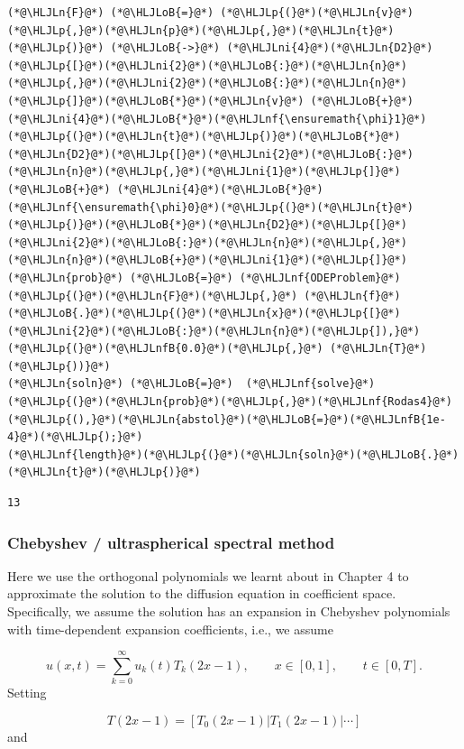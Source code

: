 \documentclass[12pt,a4paper]{article}
\newcommand{\HLJLn}[1]{#1}
\newcommand{\HLJLnf}[1]{\textcolor[RGB]{66,102,213}{#1}}
\newcommand{\HLJLnfB}[1]{\textcolor[RGB]{59,151,46}{#1}}
\newcommand{\HLJLni}[1]{\textcolor[RGB]{59,151,46}{#1}}
\newcommand{\HLJLoB}[1]{\textcolor[RGB]{102,102,102}{\textbf{#1}}}
\newcommand{\HLJLp}[1]{#1}
\begin{document}
\begin{lstlisting}
(*@\HLJLn{F}@*) (*@\HLJLoB{=}@*) (*@\HLJLp{(}@*)(*@\HLJLn{v}@*)(*@\HLJLp{,}@*)(*@\HLJLn{p}@*)(*@\HLJLp{,}@*)(*@\HLJLn{t}@*)(*@\HLJLp{)}@*) (*@\HLJLoB{->}@*) (*@\HLJLni{4}@*)(*@\HLJLn{D2}@*)(*@\HLJLp{[}@*)(*@\HLJLni{2}@*)(*@\HLJLoB{:}@*)(*@\HLJLn{n}@*)(*@\HLJLp{,}@*)(*@\HLJLni{2}@*)(*@\HLJLoB{:}@*)(*@\HLJLn{n}@*)(*@\HLJLp{]}@*)(*@\HLJLoB{*}@*)(*@\HLJLn{v}@*) (*@\HLJLoB{+}@*) (*@\HLJLni{4}@*)(*@\HLJLoB{*}@*)(*@\HLJLnf{\ensuremath{\phi}1}@*)(*@\HLJLp{(}@*)(*@\HLJLn{t}@*)(*@\HLJLp{)}@*)(*@\HLJLoB{*}@*)(*@\HLJLn{D2}@*)(*@\HLJLp{[}@*)(*@\HLJLni{2}@*)(*@\HLJLoB{:}@*)(*@\HLJLn{n}@*)(*@\HLJLp{,}@*)(*@\HLJLni{1}@*)(*@\HLJLp{]}@*) (*@\HLJLoB{+}@*) (*@\HLJLni{4}@*)(*@\HLJLoB{*}@*)(*@\HLJLnf{\ensuremath{\phi}0}@*)(*@\HLJLp{(}@*)(*@\HLJLn{t}@*)(*@\HLJLp{)}@*)(*@\HLJLoB{*}@*)(*@\HLJLn{D2}@*)(*@\HLJLp{[}@*)(*@\HLJLni{2}@*)(*@\HLJLoB{:}@*)(*@\HLJLn{n}@*)(*@\HLJLp{,}@*)(*@\HLJLn{n}@*)(*@\HLJLoB{+}@*)(*@\HLJLni{1}@*)(*@\HLJLp{]}@*)
(*@\HLJLn{prob}@*) (*@\HLJLoB{=}@*) (*@\HLJLnf{ODEProblem}@*)(*@\HLJLp{(}@*)(*@\HLJLn{F}@*)(*@\HLJLp{,}@*) (*@\HLJLn{f}@*)(*@\HLJLoB{.}@*)(*@\HLJLp{(}@*)(*@\HLJLn{x}@*)(*@\HLJLp{[}@*)(*@\HLJLni{2}@*)(*@\HLJLoB{:}@*)(*@\HLJLn{n}@*)(*@\HLJLp{]),}@*) (*@\HLJLp{(}@*)(*@\HLJLnfB{0.0}@*)(*@\HLJLp{,}@*) (*@\HLJLn{T}@*)(*@\HLJLp{))}@*)
(*@\HLJLn{soln}@*) (*@\HLJLoB{=}@*)  (*@\HLJLnf{solve}@*)(*@\HLJLp{(}@*)(*@\HLJLn{prob}@*)(*@\HLJLp{,}@*)(*@\HLJLnf{Rodas4}@*)(*@\HLJLp{(),}@*)(*@\HLJLn{abstol}@*)(*@\HLJLoB{=}@*)(*@\HLJLnfB{1e-4}@*)(*@\HLJLp{);}@*)
(*@\HLJLnf{length}@*)(*@\HLJLp{(}@*)(*@\HLJLn{soln}@*)(*@\HLJLoB{.}@*)(*@\HLJLn{t}@*)(*@\HLJLp{)}@*)
\end{lstlisting}

\begin{lstlisting}
13
\end{lstlisting}


\subsubsection{Chebyshev / ultraspherical spectral method}
Here we use the orthogonal polynomials we learnt about in Chapter 4 to approximate the solution to the diffusion equation in coefficient space.  Specifically, we assume the solution has an expansion in Chebyshev polynomials with time-dependent expansion coefficients, i.e., we assume

\[
u(x,t) = \sum_{k = 0}^{\infty}u_k(t)T_k(2x-1), \qquad x \in [0, 1], \qquad t \in [0, T].
\]
Setting

\[
T(2x-1) = \left[T_0(2x-1) | T_1(2x-1) | \cdots \right]
\]
and
\end{document}
